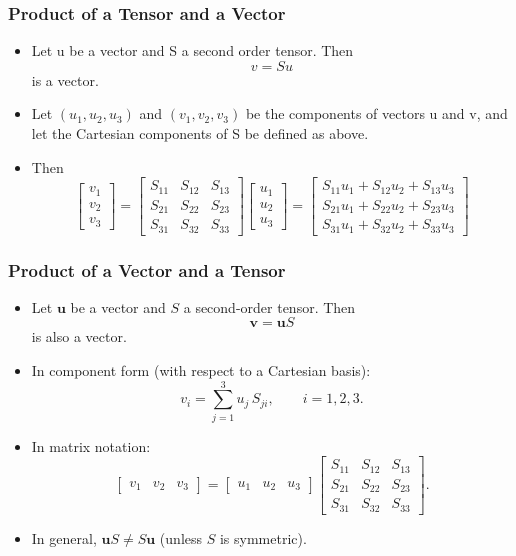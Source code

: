 \documentclass[aspectratio=169,11pt]{beamer}
\begin{document}
\begin{frame}
\frametitle{Product of a Tensor and a Vector}
\begin{itemize}
    \item Let u be a vector and S a second order tensor.  Then
    \[
    v = S u
    \]
    is a vector. 
    \item Let \((u_1, u_2, u_3)\) and \((v_1, v_2, v_3)\) be the components of vectors u and v, and let the Cartesian components of S be defined as above. 
    \item Then
    \[
    \begin{bmatrix}
        v_1 \\
        v_2 \\
        v_3
    \end{bmatrix} =
    \begin{bmatrix}
        S_{11} & S_{12} & S_{13} \\
        S_{21} & S_{22} & S_{23} \\
        S_{31} & S_{32} & S_{33}
    \end{bmatrix}
    \begin{bmatrix}
        u_1 \\
        u_2 \\
        u_3
    \end{bmatrix} =
    \begin{bmatrix}
        S_{11} u_1 + S_{12} u_2 + S_{13}u_3 \\
        S_{21} u_1 + S_{22} u_2 + S_{23}u_3 \\
        S_{31} u_1 + S_{32} u_2 + S_{33}u_3
    \end{bmatrix}
    \]
\end{itemize}
\end{frame}

\begin{frame}
\frametitle{Product of a Vector and a Tensor}
\begin{itemize}
    \item Let $\mathbf{u}$ be a vector and $S$ a second-order tensor. Then
    \[
      \mathbf{v} = \mathbf{u} S
    \]
    is also a vector.
    \item In component form (with respect to a Cartesian basis):
    \[
      v_i = \sum_{j=1}^3 u_j\, S_{ji}, \qquad i = 1,2,3.
    \]
    \item In matrix notation:
    \[
      \begin{bmatrix} v_1 & v_2 & v_3 \end{bmatrix}
      =
      \begin{bmatrix} u_1 & u_2 & u_3 \end{bmatrix}
      \begin{bmatrix}
        S_{11} & S_{12} & S_{13} \\
        S_{21} & S_{22} & S_{23} \\
        S_{31} & S_{32} & S_{33}
      \end{bmatrix}.
    \]
    \item In general, $\mathbf{u} S \neq S \mathbf{u}$ (unless $S$ is symmetric).
\end{itemize}
\end{frame}
\end{document}
